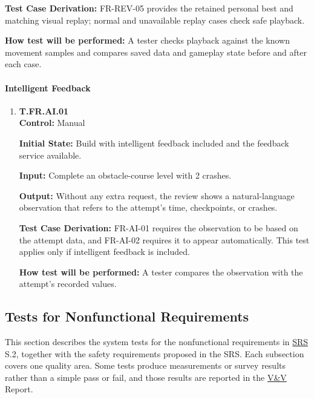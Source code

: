 \documentclass[12pt, titlepage]{article}
\begin{document}
{\begin{enumerate}
\textbf{Test Case Derivation:} \mbox{FR-REV-05} provides the retained personal best
and matching visual replay; normal and unavailable replay cases check safe playback.

\textbf{How test will be performed:} A tester checks playback against the known
movement samples and compares saved data and gameplay state before and after each case.

\end{enumerate}

\paragraph{Intelligent Feedback}

\begin{enumerate}

\item{\hypertarget{test-fr-ai-01}{}\textbf{T.FR.AI.01}\\}
\textbf{Control:} Manual

\textbf{Initial State:} Build with intelligent feedback included and the feedback
service available.

\textbf{Input:} Complete an obstacle-course level with 2 crashes.

\textbf{Output:} Without any extra request, the review shows a natural-language
observation that refers to the attempt's time, checkpoints, or crashes.

\textbf{Test Case Derivation:} \mbox{FR-AI-01} requires the observation to be based on
the attempt data, and \mbox{FR-AI-02} requires it to appear automatically. This test
applies only if intelligent feedback is included.

\textbf{How test will be performed:} A tester compares the observation with the
attempt's recorded values.

\end{enumerate}
\par}

\subsection{Tests for Nonfunctional Requirements}

This section describes the system tests for the nonfunctional requirements in \hyperlink{abbr:SRS}{SRS} S.2,
together with the safety requirements proposed in the SRS. Each subsection covers one
quality area. Some tests produce measurements or survey results rather than a simple
pass or fail, and those results are reported in the \hyperlink{abbr:VnV}{V\&V} Report.
\end{document}
